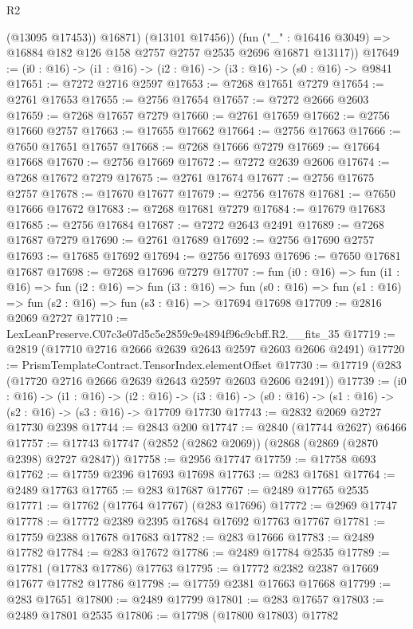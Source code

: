 \begin{lexlean}{R2}
\begin{coremodule}
            (@13095 @17453))
          @16871)
        (@13101 @17456))
      (fun ("_" : @16416 @3049) => @16884 @182 @126 @158 @2757 @2757 @2535 @2696 @16871 @13117))
@17649 := (i0 : @16) -> (i1 : @16) -> (i2 : @16) -> (i3 : @16) -> (s0 : @16) -> @9841
@17651 := @7272 @2716 @2597
@17653 := @7268 @17651 @7279
@17654 := @2761 @17653
@17655 := @2756 @17654
@17657 := @7272 @2666 @2603
@17659 := @7268 @17657 @7279
@17660 := @2761 @17659
@17662 := @2756 @17660 @2757
@17663 := @17655 @17662
@17664 := @2756 @17663
@17666 := @7650 @17651 @17657
@17668 := @7268 @17666 @7279
@17669 := @17664 @17668
@17670 := @2756 @17669
@17672 := @7272 @2639 @2606
@17674 := @7268 @17672 @7279
@17675 := @2761 @17674
@17677 := @2756 @17675 @2757
@17678 := @17670 @17677
@17679 := @2756 @17678
@17681 := @7650 @17666 @17672
@17683 := @7268 @17681 @7279
@17684 := @17679 @17683
@17685 := @2756 @17684
@17687 := @7272 @2643 @2491
@17689 := @7268 @17687 @7279
@17690 := @2761 @17689
@17692 := @2756 @17690 @2757
@17693 := @17685 @17692
@17694 := @2756 @17693
@17696 := @7650 @17681 @17687
@17698 := @7268 @17696 @7279
@17707 := fun (i0 : @16) =>
  fun (i1 : @16) =>
  fun (i2 : @16) =>
  fun (i3 : @16) =>
  fun (s0 : @16) => fun (s1 : @16) => fun (s2 : @16) => fun (s3 : @16) => @17694 @17698
@17709 := @2816 @2069 @2727
@17710 := LexLeanPreserve.C07c3e07d5c5e2859c9e4894f96c9cbff.R2.__fits_35
@17719 := @2819 (@17710 @2716 @2666 @2639 @2643 @2597 @2603 @2606 @2491)
@17720 := PrismTemplateContract.TensorIndex.elementOffset
@17730 := @17719 (@283 (@17720 @2716 @2666 @2639 @2643 @2597 @2603 @2606 @2491))
@17739 := (i0 : @16) ->
  (i1 : @16) ->
  (i2 : @16) -> (i3 : @16) -> (s0 : @16) -> (s1 : @16) -> (s2 : @16) -> (s3 : @16) -> @17709 @17730
@17743 := @2832 @2069 @2727 @17730 @2398
@17744 := @2843 @200
@17747 := @2840 (@17744 @2627) @6466
@17757 := @17743 @17747 (@2852 (@2862 @2069)) (@2868 (@2869 (@2870 @2398) @2727 @2847))
@17758 := @2956 @17747
@17759 := @17758 @693
@17762 := @17759 @2396 @17693 @17698
@17763 := @283 @17681
@17764 := @2489 @17763
@17765 := @283 @17687
@17767 := @2489 @17765 @2535
@17771 := @17762 (@17764 @17767) (@283 @17696)
@17772 := @2969 @17747
@17778 := @17772 @2389 @2395 @17684 @17692 @17763 @17767
@17781 := @17759 @2388 @17678 @17683
@17782 := @283 @17666
@17783 := @2489 @17782
@17784 := @283 @17672
@17786 := @2489 @17784 @2535
@17789 := @17781 (@17783 @17786) @17763
@17795 := @17772 @2382 @2387 @17669 @17677 @17782 @17786
@17798 := @17759 @2381 @17663 @17668
@17799 := @283 @17651
@17800 := @2489 @17799
@17801 := @283 @17657
@17803 := @2489 @17801 @2535
@17806 := @17798 (@17800 @17803) @17782

\end{coremodule}
\end{lexlean}
